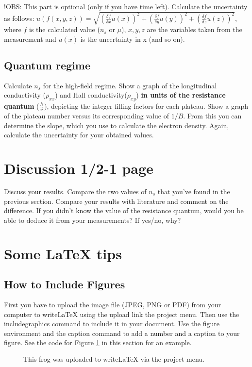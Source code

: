 \documentclass[a4paper]{article}
\begin{document}
!OBS: This part is optional (only if you have time left).
Calculate the uncertainty as follows: \newline $u(f(x, y, z)) = \sqrt{(\frac{\delta f}{\delta{x}} u(x))^{2} + (\frac{\delta f}{\delta{y}} u(y))^{2} + (\frac{\delta f}{\delta{z}} u(z))^{2}}$, where $f$ is the calculated value ($n_{s}$ or $\mu$), $x, y, z$ are the variables taken from the measurement and $u(x)$ is the uncertainty in x (and so on).

\subsection{Quantum regime}
Calculate $n_{s}$ for the high-field regime.
Show a graph of the longitudinal conductivity ($\rho_{xx}$) and Hall conductivity($\rho_{xy}$) \textbf{in units of the resistance quantum} ($\frac{h}{e^{2}}$), depicting the integer filling factors for each plateau.
Show a graph of the plateau number versus its corresponding value of $1/B$. From this you can determine the slope, which you use to calculate the electron density.
Again, calculate the uncertainty for your obtained values.

\section{Discussion 1/2-1 page}
Discuss your results. Compare the two values of $n_{s}$ that you've found in the previous section. Compare your results with literature and comment on the difference. If you didn't know the value of the resistance quantum, would you be able to deduce it from your measurements? If yes/no, why?

\newpage
\section{Some LaTeX tips}
\label{sec:latex}
\subsection{How to Include Figures}

First you have to upload the image file (JPEG, PNG or PDF) from your computer to writeLaTeX using the upload link the project menu. Then use the includegraphics command to include it in your document. Use the figure environment and the caption command to add a number and a caption to your figure. See the code for Figure \ref{fig:frog} in this section for an example.

\begin{figure}
\centering
\caption{\label{fig:frog}This frog was uploaded to writeLaTeX via the project menu.}
\end{figure}
\end{document}
